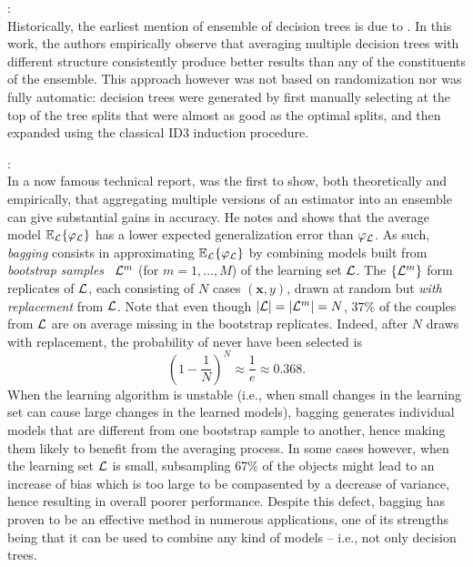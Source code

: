 \begin{description}

\item \citet{kwok:1990}: \hfill \\
    Historically, the earliest mention of ensemble of decision trees is due to
    \citet{kwok:1990}. In this work, the authors empirically observe that
    averaging multiple decision trees with different structure consistently
    produce better results than any of the constituents of the ensemble. This
    approach however was not based on randomization nor was fully automatic:
    decision trees were generated by first manually selecting at the top of the
    tree splits that were almost as good as the optimal splits, and then
    expanded using the classical ID3 induction procedure.

\item \citet{breiman:1996b}: \hfill \\
    In a now famous technical report, \citet{breiman:1996b} was the first to
    show, both theoretically and empirically, that aggregating multiple
    versions of an estimator into an ensemble can give substantial gains in
    accuracy. He notes and shows that the average model $\mathbb{E}_{\cal L}\{
    \varphi_{\cal L} \}$ has a lower expected generalization error than
    $\varphi_{\cal L}$. As such, \textit{bagging}  consists in
    approximating $\mathbb{E}_{\cal L}\{ \varphi_{\cal L} \}$  by combining
    models built from \textit{bootstrap samples}~\citep{efron:1979} ${\cal
    L}^m$ (for $m=1,\dots,M$) of the learning set ${\cal L}$. The $\{ {\cal
    L}^m \}$ form replicates of ${\cal L}$, each consisting of $N$ cases $(\mathbf{x},y)$, drawn
    at random but \textit{with replacement} from ${\cal L}$. Note that even
    though $|{\cal L}|=|{\cal L}^m|=N$, $37\%$ of the couples from ${\cal L}$
    are on average missing in the bootstrap replicates. Indeed, after $N$ draws
    with replacement, the probability of never have been selected is
    \begin{equation}
    (1 - \frac{1}{N})^N \approx \frac{1}{e} \approx 0.368.
    \end{equation}
    When the learning algorithm is unstable (i.e., when small changes in the
    learning set can cause large changes in the learned models), bagging
    generates individual models that are  different from one bootstrap sample
    to another, hence making them likely to benefit from the averaging process.
    In some cases however, when the learning set ${\cal L}$ is small,
    subsampling $67\%$ of the objects might lead to an increase of bias which
    is too large to be compasented by a decrease of variance, hence resulting
    in overall poorer performance. Despite this defect, bagging has proven to
    be an effective method in numerous applications, one of its strengths being
    that it can be used to combine any kind of models -- i.e., not only
    decision trees.


\end{description}

